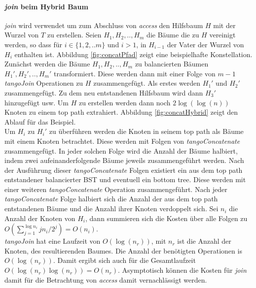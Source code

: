 \documentclass[a4paper,12pt]{article}
\begin{document}
\paragraph{\textit{join} beim Hybrid Baum}
\textit{join} wird verwendet um zum Abschluss von \textit{access} den Hilfsbaum $H$ mit der Wurzel von $T$ zu erstellen. Seien $H_1,H_2,..,H_m$ die Bäume die zu $H$ vereinigt werden, so dass für $i \in \{1,2,..m\}$ und $i > 1$, in $H_{i-1}$ der Vater der Wurzel von $H_i$ enthalten ist. Abbildung \ref{fig:concatPfad} zeigt eine beispielhafte Konstellation. Zunächst werden die Bäume $H_1,H_2,..,H_m$ zu balancierten Bäumen $H_1',H_2',..,H_m'$ transformiert. Diese werden dann mit einer Folge von $m-1$ \textit{tangoJoin} Operationen zu $H$ zusammengefügt. Als erstes werden $H_1'$ und $H_2'$ zusammengefügt. Zu dem neu entstandenen Hilfsbaum wird dann $H_3'$ hinzugefügt usw.  Um $H$ zu erstellen werden dann noch $2\log\left(\log\left(n\right)\right)$ Knoten zu einem top path extrahiert. Abbildung \ref{fig:concatHybrid} zeigt den Ablauf für das Beispiel.\\
Um $H_i$ zu $H_i'$ zu überführen werden die Knoten in seinem top path als Bäume mit einem Knoten betrachtet. Diese werden mit Folgen von  \textit{tangoConcatenate} zusammengefügt. In jeder solchen Folge wird die Anzahl der Bäume halbiert, indem zwei aufeinanderfolgende Bäume jeweils zusammengeführt werden. Nach der Ausführung dieser \textit{tangoConcatenate} Folgen existiert ein aus dem top path entstandener balancierter BST und eventuell ein bottom tree. Diese werden mit einer weiteren \textit{tangoConcatenate} Operation zusammengeführt. Nach jeder \textit{tangoConcatenate} Folge halbiert sich die Anzahl der aus dem top path entstandenen Bäume und die Anzahl ihrer Knoten verdoppelt sich. Sei $n_i$ die Anzahl der Knoten von $H_i$, dann summieren sich die Kosten über alle Folgen zu $O\left(\sum_{j = 1}^{\log n_i} j n_i / 2^j\right) = O\left(n_i\right)$.  \\
\textit{tangoJoin} hat eine Laufzeit von $O\left(\log\left( n_r\right)\right)$, mit $n_r$ ist die Anzahl der Knoten, des resultierenden Baumes. Die Anzahl der benötigten Operationen is $O\left(\log\left(n_r\right)\right)$. Damit ergibt sich auch für die Gesamtlaufzeit  $O\left(\log\left(n_r\right)\log\left( n_r \right) \right) = O\left(n_r\right)$. Asymptotisch können die Kosten für \textit{join} damit für die Betrachtung von \textit{access} damit vernachlässigt werden.
 
\end{document}

